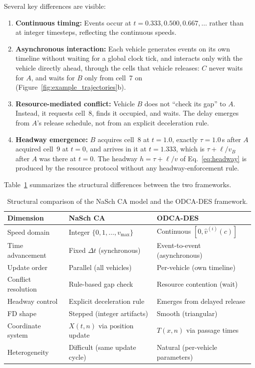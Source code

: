 \documentclass[review,number]{elsarticle}
\begin{document}
Several key differences are visible:
\begin{enumerate}
    \item \textbf{Continuous timing:} Events occur at $t = 0.333, 0.500, 0.667, \ldots$ rather than at integer timesteps, reflecting the continuous speeds.
    \item \textbf{Asynchronous interaction:} Each vehicle generates events on its own timeline without waiting for a global clock tick, and interacts only with the vehicle directly ahead, through the cells that vehicle releases: $C$ never waits for $A$, and waits for $B$ only from cell~7 on (Figure~\ref{fig:example_trajectories}b).
    \item \textbf{Resource-mediated conflict:} Vehicle $B$ does not ``check its gap'' to $A$. Instead, it requests cell~8, finds it occupied, and waits. The delay emerges from $A$'s release schedule, not from an explicit deceleration rule.
    \item \textbf{Headway emergence:} $B$ acquires cell~8 at $t = 1.0$, exactly $\tau = 1.0$\,s after $A$ acquired cell~9 at $t = 0$, and arrives in it at $t = 1.333$, which is $\tau + \ell/v_B$ after $A$ was there at $t = 0$. The headway $h = \tau + \ell/v$ of Eq.~\eqref{eq:headway} is produced by the resource protocol without any headway-enforcement rule.
\end{enumerate}

Table~\ref{tab:comparison_summary} summarizes the structural differences between the two frameworks.

\begin{table}[ht]
\centering
\caption{Structural comparison of the NaSch CA model and the ODCA-DES framework.}
\label{tab:comparison_summary}
\begin{tabular}{@{}lll@{}}
\toprule
Dimension & NaSch CA & ODCA-DES \\
\midrule
Speed domain & Integer $\{0,1,\ldots,v_{\max}\}$ & Continuous $[0, \hat{v}^{(i)}(c)]$ \\
Time advancement & Fixed $\Delta t$ (synchronous) & Event-to-event (asynchronous) \\
Update order & Parallel (all vehicles) & Per-vehicle (own timeline) \\
Conflict resolution & Rule-based gap check & Resource contention (wait) \\
Headway control & Explicit deceleration rule & Emerges from delayed release \\
FD shape & Stepped (integer artifacts) & Smooth (triangular) \\
Coordinate system & $X(t,n)$ via position update & $T(x,n)$ via passage times \\
Heterogeneity & Difficult (same update cycle) & Natural (per-vehicle parameters) \\
\bottomrule
\end{tabular}
\end{table}
\end{document}
